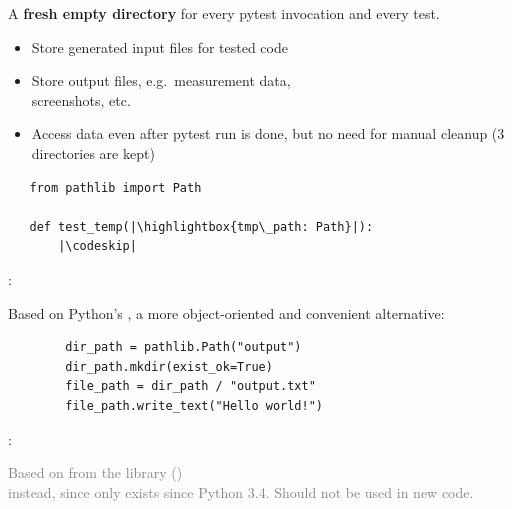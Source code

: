 
A \textbf{fresh empty directory} for every pytest invocation and every test.

\begin{itemize}[itemsep=0pt]
    \item Store generated input files for tested code
    \item Store output files, e.g.\ measurement data, \\ screenshots, etc.
    \item Access data even after pytest run is done, but no need for manual cleanup (3 directories are kept)
\end{itemize}

\begin{verbatim}
   from pathlib import Path

   def test_temp(|\highlightbox{tmp\_path: Path}|):
       |\codeskip|
\end{verbatim}
\vspace{.25em}%

\vspace{1.5em}
:

Based on Python's , a more object-oriented and convenient  alternative:

\begin{verbatim}
        dir_path = pathlib.Path("output")
        dir_path.mkdir(exist_ok=True)
        file_path = dir_path / "output.txt"
        file_path.write_text("Hello world!")
      \end{verbatim}

 
\vspace{.65em}

:

\textcolor{gray}{%
    Based on  from the  library () \\
    instead, since  only exists since Python 3.4. Should not be used in new code.
}
